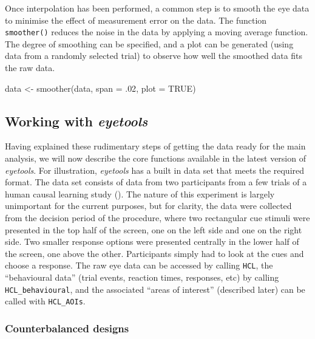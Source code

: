 \documentclass[
  man,
  floatsintext,
  longtable,
  nolmodern,
  notxfonts,
  notimes,
  colorlinks=true,linkcolor=blue,citecolor=blue,urlcolor=blue]{apa7}
\newenvironment{Shaded}{\begin{snugshade}}{\end{snugshade}}
\newcommand{\AttributeTok}[1]{\textcolor[rgb]{0.40,0.45,0.13}{#1}}
\newcommand{\ConstantTok}[1]{\textcolor[rgb]{0.56,0.35,0.01}{#1}}
\newcommand{\DecValTok}[1]{\textcolor[rgb]{0.68,0.00,0.00}{#1}}
\newcommand{\FunctionTok}[1]{\textcolor[rgb]{0.28,0.35,0.67}{#1}}
\newcommand{\NormalTok}[1]{\textcolor[rgb]{0.00,0.23,0.31}{#1}}
\newcommand{\OtherTok}[1]{\textcolor[rgb]{0.00,0.23,0.31}{#1}}
\begin{document}
Once interpolation has been performed, a common step is to smooth the
eye data to minimise the effect of measurement error on the data. The
function \texttt{smoother()} reduces the noise in the data by applying a
moving average function. The degree of smoothing can be specified, and a
plot can be generated (using data from a randomly selected trial) to
observe how well the smoothed data fits the raw data.

\begin{Shaded}
\begin{Highlighting}[]
\NormalTok{data }\OtherTok{\textless{}{-}} \FunctionTok{smoother}\NormalTok{(data,}
                 \AttributeTok{span =}\NormalTok{ .}\DecValTok{02}\NormalTok{,}
                 \AttributeTok{plot =} \ConstantTok{TRUE}\NormalTok{)}
\end{Highlighting}
\end{Shaded}

\subsection{\texorpdfstring{Working with
\emph{eyetools}}{Working with eyetools}}\label{working-with-eyetools}

Having explained these rudimentary steps of getting the data ready for
the main analysis, we will now describe the core functions available in
the latest version of \emph{eyetools}. For illustration, \emph{eyetools}
has a built in data set that meets the required format. The data set
consists of data from two participants from a few trials of a human
causal learning study (). The nature of this experiment is largely unimportant for the
current purposes, but for clarity, the data were collected from the
decision period of the procedure, where two rectangular cue stimuli were
presented in the top half of the screen, one on the left side and one on
the right side. Two smaller response options were presented centrally in
the lower half of the screen, one above the other. Participants simply
had to look at the cues and choose a response. The raw eye data can be
accessed by calling \texttt{HCL}, the ``behavioural data'' (trial
events, reaction times, responses, etc) by calling
\texttt{HCL\_behavioural}, and the associated ``areas of interest''
(described later) can be called with \texttt{HCL\_AOIs}.

\subsubsection{Counterbalanced designs}\label{counterbalanced-designs}
\end{document}

